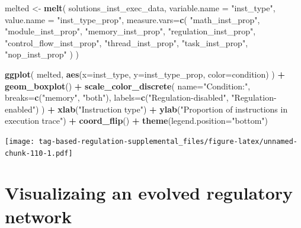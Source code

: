 \documentclass[]{book}
\newenvironment{Shaded}{\begin{snugshade}}{\end{snugshade}}
\newcommand{\DataTypeTok}[1]{\textcolor[rgb]{0.13,0.29,0.53}{#1}}
\newcommand{\KeywordTok}[1]{\textcolor[rgb]{0.13,0.29,0.53}{\textbf{#1}}}
\newcommand{\NormalTok}[1]{#1}
\newcommand{\OperatorTok}[1]{\textcolor[rgb]{0.81,0.36,0.00}{\textbf{#1}}}
\newcommand{\StringTok}[1]{\textcolor[rgb]{0.31,0.60,0.02}{#1}}
\begin{document}
\begin{Shaded}
\begin{Highlighting}[]
\NormalTok{melted <-}\StringTok{ }\KeywordTok{melt}\NormalTok{(}
\NormalTok{  solutions_inst_exec_data,}
  \DataTypeTok{variable.name =} \StringTok{"inst_type"}\NormalTok{,}
  \DataTypeTok{value.name =} \StringTok{"inst_type_prop"}\NormalTok{,}
  \DataTypeTok{measure.vars=}\KeywordTok{c}\NormalTok{(}
    \StringTok{"math_inst_prop"}\NormalTok{,}
    \StringTok{"module_inst_prop"}\NormalTok{,}
    \StringTok{"memory_inst_prop"}\NormalTok{,}
    \StringTok{"regulation_inst_prop"}\NormalTok{,}
    \StringTok{"control_flow_inst_prop"}\NormalTok{,}
    \StringTok{"thread_inst_prop"}\NormalTok{,}
    \StringTok{"task_inst_prop"}\NormalTok{,}
    \StringTok{"nop_inst_prop"}
\NormalTok{  )}
\NormalTok{)}

\KeywordTok{ggplot}\NormalTok{( melted, }\KeywordTok{aes}\NormalTok{(}\DataTypeTok{x=}\NormalTok{inst_type, }\DataTypeTok{y=}\NormalTok{inst_type_prop, }\DataTypeTok{color=}\NormalTok{condition) ) }\OperatorTok{+}
\StringTok{  }\KeywordTok{geom_boxplot}\NormalTok{() }\OperatorTok{+}
\StringTok{  }\KeywordTok{scale_color_discrete}\NormalTok{(}
    \DataTypeTok{name=}\StringTok{"Condition:"}\NormalTok{,}
    \DataTypeTok{breaks=}\KeywordTok{c}\NormalTok{(}\StringTok{"memory"}\NormalTok{, }\StringTok{"both"}\NormalTok{),}
    \DataTypeTok{labels=}\KeywordTok{c}\NormalTok{(}\StringTok{"Regulation-disabled"}\NormalTok{, }\StringTok{"Regulation-enabled"}\NormalTok{)}
\NormalTok{  ) }\OperatorTok{+}
\StringTok{  }\KeywordTok{xlab}\NormalTok{(}\StringTok{"Instruction type"}\NormalTok{) }\OperatorTok{+}
\StringTok{  }\KeywordTok{ylab}\NormalTok{(}\StringTok{"Proportion of instructions in execution trace"}\NormalTok{) }\OperatorTok{+}
\StringTok{  }\KeywordTok{coord_flip}\NormalTok{() }\OperatorTok{+}
\StringTok{  }\KeywordTok{theme}\NormalTok{(}\DataTypeTok{legend.position=}\StringTok{"bottom"}\NormalTok{)}
\end{Highlighting}
\end{Shaded}

\texttt{[image: tag-based-regulation-supplemental\_files/figure-latex/unnamed-chunk-110-1.pdf]}

\hypertarget{visualizaing-an-evolved-regulatory-network-1}{%
\section{Visualizaing an evolved regulatory network}\label{visualizaing-an-evolved-regulatory-network-1}}
\end{document}
